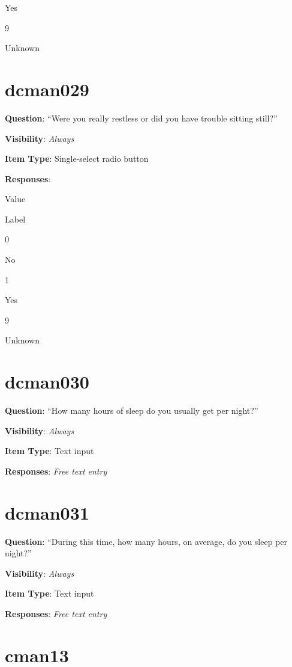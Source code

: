 \documentclass[]{book}
\begin{document}
Yes

9

Unknown

\hypertarget{dcman029}{%
\section{dcman029}\label{dcman029}}

\textbf{Question}: ``Were you really restless or did you have trouble sitting still?''

\textbf{Visibility}: \emph{Always}

\textbf{Item Type}: Single-select radio button

\textbf{Responses}:

Value

Label

0

No

1

Yes

9

Unknown

\hypertarget{dcman030}{%
\section{dcman030}\label{dcman030}}

\textbf{Question}: ``How many hours of sleep do you usually get per night?''

\textbf{Visibility}: \emph{Always}

\textbf{Item Type}: Text input

\textbf{Responses}: \emph{Free text entry}

\hypertarget{dcman031}{%
\section{dcman031}\label{dcman031}}

\textbf{Question}: ``During this time, how many hours, on average, do you sleep per night?''

\textbf{Visibility}: \emph{Always}

\textbf{Item Type}: Text input

\textbf{Responses}: \emph{Free text entry}

\hypertarget{cman13}{%
\section{cman13}\label{cman13}}
\end{document}
